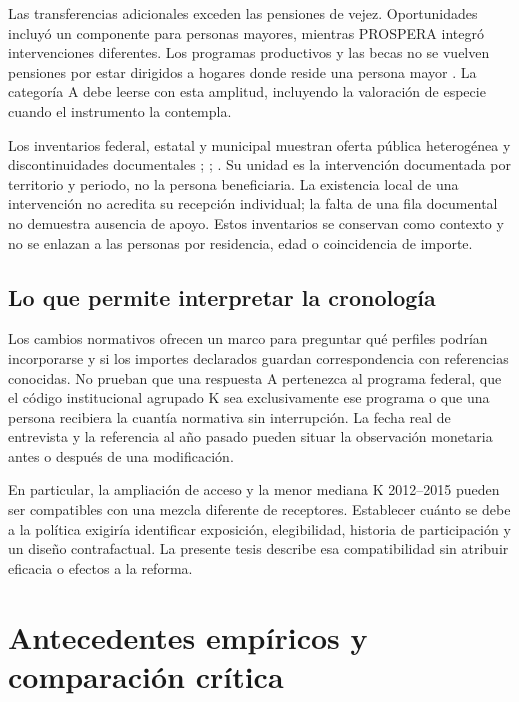 Las transferencias adicionales exceden las pensiones de vejez.
Oportunidades incluyó un componente para personas mayores, mientras
PROSPERA integró intervenciones diferentes. Los programas productivos y
las becas no se vuelven pensiones por estar dirigidos a hogares donde reside
una persona mayor \citep{oportunidades2006,oportunidades2007,prospera2015}.
La categoría A debe leerse con esta amplitud, incluyendo la valoración de
especie cuando el instrumento la contempla.

Los inventarios federal, estatal y municipal muestran oferta pública
heterogénea y discontinuidades documentales
\citep{conevalhistoricofederal}; \citep{conevalhistoricoestatal}; \citep{conevalhistoricmunicipal}.
Su unidad es la intervención documentada por territorio y periodo, no la
persona beneficiaria. La existencia local de una intervención no acredita
su recepción individual; la falta de una fila documental no demuestra
ausencia de apoyo. Estos inventarios se conservan como contexto y no se
enlazan a las personas por residencia, edad o coincidencia de importe.

\subsection{Lo que permite interpretar la cronología}

Los cambios normativos ofrecen un marco para preguntar qué perfiles
podrían incorporarse y si los importes declarados guardan correspondencia
con referencias conocidas. No prueban que una respuesta A pertenezca al
programa federal, que el código institucional agrupado K sea exclusivamente
ese programa o que una persona recibiera la cuantía normativa sin interrupción.
La fecha real de entrevista y la referencia al año pasado pueden situar
la observación monetaria antes o después de una modificación.

En particular, la ampliación de acceso y la menor mediana K 2012--2015
pueden ser compatibles con una mezcla diferente de receptores. Establecer
cuánto se debe a la política exigiría identificar exposición, elegibilidad,
historia de participación y un diseño contrafactual. La presente tesis
describe esa compatibilidad sin atribuir eficacia o efectos a la reforma.

\section{Antecedentes empíricos y comparación crítica}
\label{sec:literatura-proxima}

